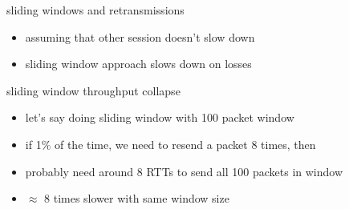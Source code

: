 \begin{frame}{sliding windows and retransmissions}
    \begin{itemize}
    \item assuming that other session doesn't slow down
    \vspace{.5cm}
    \item sliding window approach slows down on losses
    \end{itemize}
\end{frame}

\begin{frame}{sliding window throughput collapse}
\begin{itemize}
\item let's say doing sliding window with 100 packet window
\item if 1\% of the time, we need to resend a packet 8 times, then
\item probably need around 8 RTTs to send all 100 packets in window
\vspace{.5cm}
\item<2-> $\approx$ 8 times slower with same window size
\end{itemize}
\end{frame}
